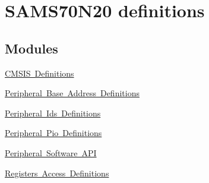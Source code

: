 \hypertarget{group__SAMS70N20__definitions}{}\section{S\+A\+M\+S70\+N20 definitions}
\label{group__SAMS70N20__definitions}
\subsection*{Modules}
\begin{DoxyCompactItemize}
\item 
\mbox{\hyperlink{group__SAMS70N20__cmsis}{C\+M\+S\+I\+S Definitions}}
\item 
\mbox{\hyperlink{group__SAMS70N20__base}{Peripheral Base Address Definitions}}
\item 
\mbox{\hyperlink{group__SAMS70N20__id}{Peripheral Ids Definitions}}
\item 
\mbox{\hyperlink{group__SAMS70N20__pio}{Peripheral Pio Definitions}}
\item 
\mbox{\hyperlink{group__SAMS70N20__api}{Peripheral Software A\+PI}}
\item 
\mbox{\hyperlink{group__SAMS70N20__reg}{Registers Access Definitions}}
\end{DoxyCompactItemize}

